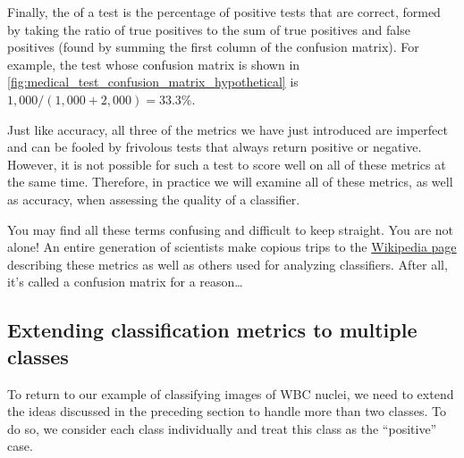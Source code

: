 Finally, the  of a test is the percentage of positive tests that are correct, formed by taking the ratio of true positives to the sum of true positives and false positives (found by summing the first column of the confusion matrix). For example, the  test whose confusion matrix is shown in \autoref{fig:medical_test_confusion_matrix_hypothetical} is $1,000/(1,000 + 2,000) = 33.3\%$.\\

\begin{qbox}\end{qbox}

Just like accuracy, all three of the metrics we have just introduced are imperfect and can be fooled by frivolous tests that always return positive or negative. However, it is not possible for such a test to score well on all of these metrics at the same time. Therefore, in practice we will examine all of these metrics, as well as accuracy, when assessing the quality of a classifier.\\

\begin{qbox}\end{qbox}

You may find all these terms confusing and difficult to keep straight. You are not alone! An entire generation of scientists make copious trips to the \href{https://en.wikipedia.org/wiki/Precision_and_recall#Definition_(classification_context)}{Wikipedia page} describing these metrics as well as others used for analyzing classifiers. After all, it's called a confusion matrix for a reason\ldots

\FloatBarrier
{}
\subsection{Extending classification metrics to multiple classes}

To return to our example of classifying images of WBC nuclei, we need to extend the ideas discussed in the preceding section to handle more than two classes. To do so, we consider each class individually and treat this class as the ``positive'' case.

